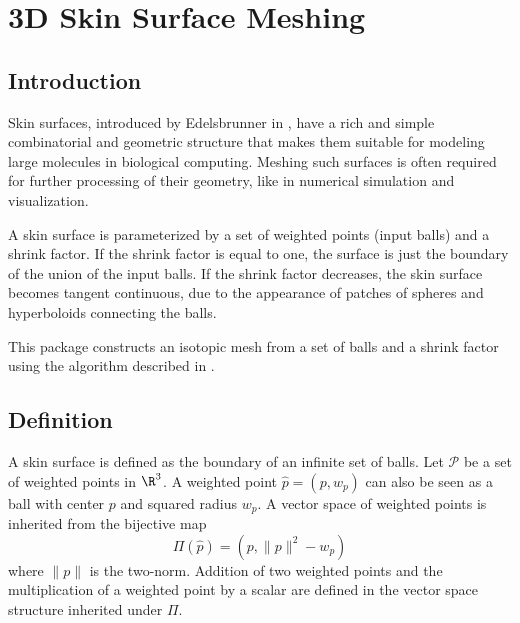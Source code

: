 
\chapter{3D Skin Surface Meshing}
\label{chapterSkinSurface}

\minitoc

\section{Introduction}
\label{sectionSkinSurfaceIntro}

Skin surfaces, introduced by Edelsbrunner in \cite{cgal:e-dssd-99},
have a rich and simple combinatorial and geometric structure that
makes them suitable for modeling large molecules in biological
computing.  Meshing such surfaces is often required for further
processing of their geometry, like in numerical simulation and
visualization.

A skin surface is parameterized by a set of weighted points (input
balls) and a shrink factor. If the shrink factor is equal to one, the
surface is just the boundary of the union of the input balls.  If the
shrink factor decreases, the skin surface becomes tangent continuous,
due to the appearance of patches of spheres and hyperboloids
connecting the balls.

This package constructs an isotopic mesh from a set of balls and a
shrink factor using the algorithm described in
\cite{cgal:kv-mssct-05}. 

\section{Definition}
A skin surface is defined as the boundary of an infinite set of balls.
Let $\mathcal{P}$ be a set of weighted points in $\R^3$. A weighted
point ${\hat{p}}=(p,w_p)$ can also be seen as a ball with center $p$
and squared radius $w_p$. A vector space of weighted points is
inherited from the bijective map
\[\Pi({\hat{p}}) = ({p, \|{p}\|^2-w_p})\]
where $\|{p}\|$ is the two-norm. Addition of two weighted points and
the multiplication of a weighted point by a scalar are defined in the
vector space structure inherited under $\Pi$.

